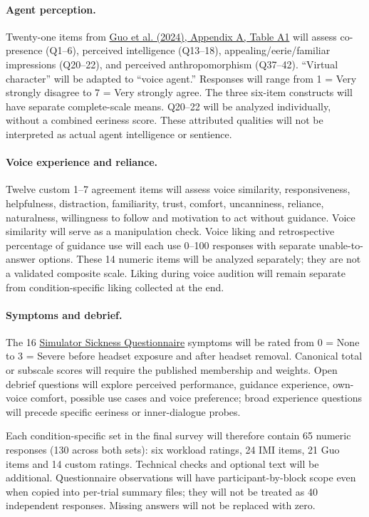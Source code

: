 \documentclass[11pt,letterpaper]{article}
\begin{document}
\paragraph{Agent perception.} Twenty-one items from \href{https://doi.org/10.1145/3651288}{Guo et al. (2024), Appendix A, Table A1} will assess co-presence (Q1--6), perceived intelligence (Q13--18), appealing/eerie/familiar impressions (Q20--22), and perceived anthropomorphism (Q37--42). ``Virtual character'' will be adapted to ``voice agent.'' Responses will range from 1 = Very strongly disagree to 7 = Very strongly agree. The three six-item constructs will have separate complete-scale means. Q20--22 will be analyzed individually, without a combined eeriness score. These attributed qualities will not be interpreted as actual agent intelligence or sentience.

\paragraph{Voice experience and reliance.} Twelve custom 1--7 agreement items will assess voice similarity, responsiveness, helpfulness, distraction, familiarity, trust, comfort, uncanniness, reliance, naturalness, willingness to follow and motivation to act without guidance. Voice similarity will serve as a manipulation check. Voice liking and retrospective percentage of guidance use will each use 0--100 responses with separate unable-to-answer options. These 14 numeric items will be analyzed separately; they are not a validated composite scale. Liking during voice audition will remain separate from condition-specific liking collected at the end.

\paragraph{Symptoms and debrief.} The 16 \href{https://doi.org/10.1207/s15327108ijap0303_3}{Simulator Sickness Questionnaire} symptoms will be rated from 0 = None to 3 = Severe before headset exposure and after headset removal. Canonical total or subscale scores will require the published membership and weights. Open debrief questions will explore perceived performance, guidance experience, own-voice comfort, possible use cases and voice preference; broad experience questions will precede specific eeriness or inner-dialogue probes.

Each condition-specific set in the final survey will therefore contain 65 numeric responses (130 across both sets): six workload ratings, 24 IMI items, 21 Guo items and 14 custom ratings. Technical checks and optional text will be additional. Questionnaire observations will have participant-by-block scope even when copied into per-trial summary files; they will not be treated as 40 independent responses. Missing answers will not be replaced with zero.
\end{document}
